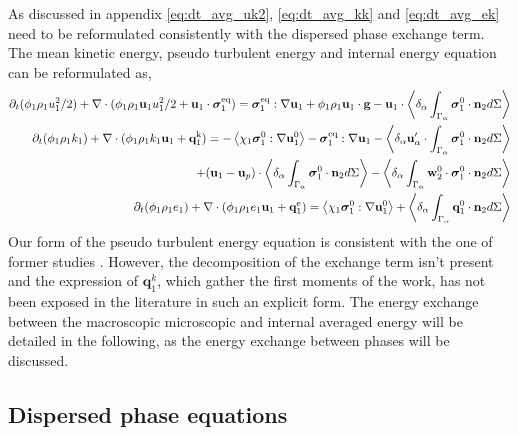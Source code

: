As discussed in appendix \ref{eq:dt_avg_uk2}, \ref{eq:dt_avg_kk} and \ref{eq:dt_avg_ek} need to be reformulated consistently with the dispersed phase exchange term. 
The mean kinetic energy, pseudo turbulent energy and internal energy equation can be reformulated as, 
\begin{align}
    \partial_t (\phi_1 \rho_1u_1^2/2)  
    + \mathbf{\nabla}\cdot (
        \phi_1 \rho_1\textbf{u}_1u_1^2/2
        + \textbf{u}_1 \cdot \bm{\sigma}_1^\text{eq}
    )
    = 
     \bm{\sigma}_1^\text{eq} : \mathbf{\nabla} \textbf{u}_1
    + \phi_1 \rho_1 \textbf{u}_1\cdot \textbf{g} 
    -  \textbf{u}_1\cdot 
        \left<\delta_\alpha \int_{\Gamma_\alpha} {\bm{\sigma}_1^0 \cdot \textbf{n}_2} d\Sigma\right> 
        \\
    \label{eq:dt_hybrid_k1}
    \partial_t (\phi_1\rho_1k_1)  
    + \mathbf{\nabla}\cdot (
        \phi_1\rho_1k_1\textbf{u}_1
        + \textbf{q}_1^\text{k} 
        )
    = 
    - \left<\chi_1\bm{\sigma}_1^0 : \mathbf{\nabla} \textbf{u}_1^0\right>
    - \bm{\sigma}_1^\text{eq} : \mathbf{\nabla} \textbf{u}_1\nonumber
    - \left<\delta_\alpha  \textbf{u}_\alpha' \cdot \int_{\Gamma_\alpha}   \bm{\sigma}_1^0 \cdot \textbf{n}_2 d\Sigma\right>\\
    + (\textbf{u}_1 - \textbf{u}_p)\cdot \left<\delta_\alpha \int_{\Gamma_\alpha} {\bm{\sigma}_1^0 \cdot \textbf{n}_2} d\Sigma\right> 
    - \left<\delta_\alpha  \int_{\Gamma_\alpha} \textbf{w}_2^0 \cdot \bm{\sigma}_1^0 \cdot \textbf{n}_2 d\Sigma\right> 
    \\
    \label{eq:dt_hybrid_e1}
    \partial_t (\phi_1\rho_1e_1)  
    + \mathbf{\nabla}\cdot (
        \phi_1 \rho_1e_1\textbf{u}_1
        +
        \textbf{q}_1^\text{e} 
        )
    = 
    \left<\chi_1\bm{\sigma}_1^0 : \mathbf{\nabla} \textbf{u}_1^0\right>
    + \left<\delta_\alpha \int_{\Gamma_\alpha} {\textbf{q}_1^0 \cdot \textbf{n}_2} d\Sigma\right> 
\end{align}
Our form of the pseudo turbulent energy equation is consistent with the one of former studies \citep[Chapter 7]{morel2015mathematical}\citep[Chapter 2]{scorsim2021particle}\citet{kataoka1989basic}. 
However, the  decomposition of the exchange term isn't present and the expression of $\textbf{q}_1^k$, which gather the first moments of the work, has not been exposed in the literature in such an explicit form.
The energy exchange between the macroscopic microscopic and internal averaged energy will be detailed in the following, as the energy exchange between phases will be discussed.   


\subsection{Dispersed phase equations}

